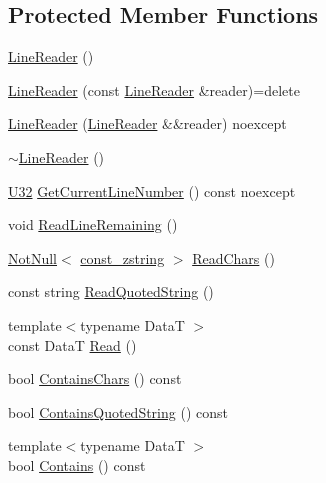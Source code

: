\subsection*{Protected Member Functions}
\begin{DoxyCompactItemize}
\item 
\mbox{\hyperlink{classmage_1_1_line_reader_ab4a46321d7ea3ecda2d6390c78a7285b}{Line\+Reader}} ()
\item 
\mbox{\hyperlink{classmage_1_1_line_reader_ae4f871bebae110704b34c0bd88460639}{Line\+Reader}} (const \mbox{\hyperlink{classmage_1_1_line_reader}{Line\+Reader}} \&reader)=delete
\item 
\mbox{\hyperlink{classmage_1_1_line_reader_ae90c546a98e113a48ca1c94b854a4866}{Line\+Reader}} (\mbox{\hyperlink{classmage_1_1_line_reader}{Line\+Reader}} \&\&reader) noexcept
\item 
\mbox{\hyperlink{classmage_1_1_line_reader_ad9753ea392ebe5b3867852d3392fb1e7}{$\sim$\+Line\+Reader}} ()
\item 
\mbox{\hyperlink{namespacemage_a41c104c036fba3756a74e19f793eeaa1}{U32}} \mbox{\hyperlink{classmage_1_1_line_reader_aa0ed768e2799b74f2341c56fc6ac4969}{Get\+Current\+Line\+Number}} () const noexcept
\item 
void \mbox{\hyperlink{classmage_1_1_line_reader_a3a4b99bfef1e8a826d74a01bcc663fcb}{Read\+Line\+Remaining}} ()
\item 
\mbox{\hyperlink{namespacemage_a8769f9d670d6b585ea306cb1062af94b}{Not\+Null}}$<$ \mbox{\hyperlink{namespacemage_abfd9206dc607ceb5d13ec68bf075a5c0}{const\+\_\+zstring}} $>$ \mbox{\hyperlink{classmage_1_1_line_reader_afcb163cbc75ad1650437d809bbbc2d9b}{Read\+Chars}} ()
\item 
const string \mbox{\hyperlink{classmage_1_1_line_reader_ae9a7547d01b29c3237b198444d4f3aef}{Read\+Quoted\+String}} ()
\item 
{\footnotesize template$<$typename DataT $>$ }\\const DataT \mbox{\hyperlink{classmage_1_1_line_reader_aa1ba5aa332e49bdd63ef4ee4021120fd}{Read}} ()
\item 
bool \mbox{\hyperlink{classmage_1_1_line_reader_a0369e06fa3b38ecb22ffd5892759225f}{Contains\+Chars}} () const
\item 
bool \mbox{\hyperlink{classmage_1_1_line_reader_a99b4fa47fc341ad4fda112ea9505efcb}{Contains\+Quoted\+String}} () const
\item 
{\footnotesize template$<$typename DataT $>$ }\\bool \mbox{\hyperlink{classmage_1_1_line_reader_a3401db2b0ecd15d8048a1b321eceb77a}{Contains}} () const
\end{DoxyCompactItemize}
